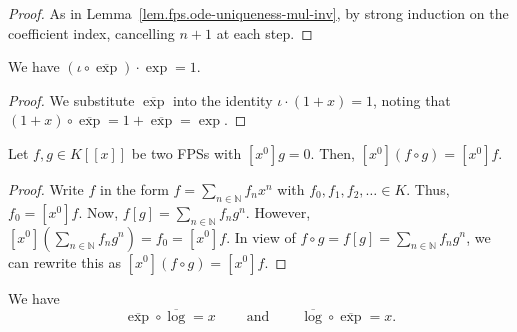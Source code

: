 \begin{proof}
As in Lemma~\ref{lem.fps.ode-uniqueness-mul-inv}, by strong induction on
the coefficient index, cancelling $n+1$ at each step.
\end{proof}

\begin{lemma}
\label{lem.fps.invOnePlusX-subst-expbar-mul-exp}
\leanhelper
\leanok
We have $(\iota \circ \overline{\exp}) \cdot \exp = 1$.
\end{lemma}

\begin{proof}
We substitute $\overline{\exp}$ into the identity
$\iota \cdot (1 + x) = 1$, noting that
$(1 + x) \circ \overline{\exp} = 1 + \overline{\exp} = \exp$.
\end{proof}

\begin{lemma}
\label{lem.fps.compos-cst-term-0}
\leantarget
\leanok
Let $f,g\in K\left[\left[x\right]
\right]$ be two FPSs with $\left[x^{0}\right]g=0$. Then, $\left[
x^{0}\right]\left(f\circ g\right)=\left[x^{0}\right]f$.
\end{lemma}

\begin{proof}
\leanok
Write $f$ in the form
$f=\sum_{n\in\mathbb{N}}f_{n}x^{n}$ with $f_{0},f_{1},f_{2},\ldots\in K$.
Thus, $f_{0}=\left[x^{0}\right]f$. Now, $f\left[g\right]=\sum_{n\in\mathbb{N}}f_{n}g^{n}$. However,
$\left[x^{0}\right]
\left(\sum_{n\in\mathbb{N}}f_{n}g^{n}\right)=f_{0}=\left[x^{0}\right]
f$. In view of $f\circ g=f\left[g\right]=\sum_{n\in\mathbb{N}}f_{n}g^{n}$,
we can rewrite this as $\left[x^{0}\right]\left(f\circ g\right)
=\left[x^{0}\right]f$.
\end{proof}

\begin{theorem}
\label{thm.fps.exp-log-inv}
\leantarget
\leanok
We have
\[
\overline{\exp}\circ\overline{\log}=x\ \ \ \ \ \ \ \ \ \ \text{and}%
\ \ \ \ \ \ \ \ \ \ \overline{\log}\circ\overline{\exp}=x.
\]
\end{theorem}

